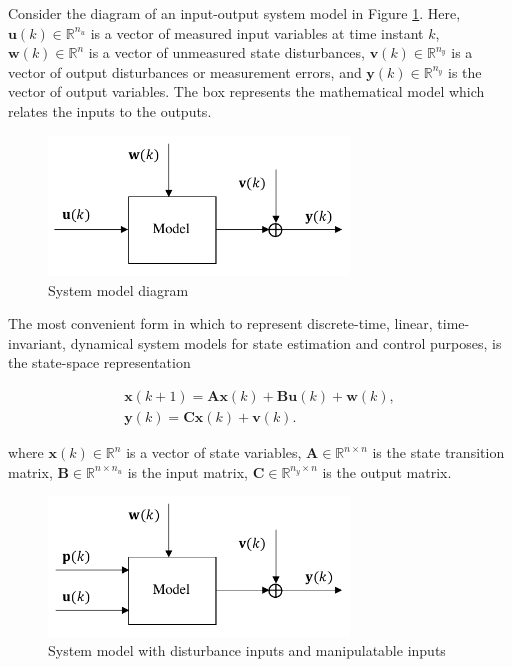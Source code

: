 Consider the diagram of an input-output system model in Figure \ref{fig:model_diag_uwvy}. Here, $\mathbf{u}(k) \in \mathbb{R}^{n_u}$ is a vector of measured input variables at time instant $k$, $\mathbf{w}(k) \in \mathbb{R}^n$ is a vector of unmeasured state disturbances, $\mathbf{v}(k) \in \mathbb{R}^{n_y}$ is a vector of output disturbances or measurement errors, and $\mathbf{y}(k) \in \mathbb{R}^{n_y}$ is the vector of output variables. The box represents the mathematical model which relates the inputs to the outputs.

\begin{figure}[htp]
	\centering
	\includegraphics[width=8cm]{images/model_diag_uwvy.pdf}
	\caption{System model diagram}
	\label{fig:model_diag_uwvy}
\end{figure}

The most convenient form in which to represent discrete-time, linear, time-invariant, dynamical system models for state estimation and control purposes, is the state-space representation

\begin{equation} \label{eq:ss_rep_uwy}
	\begin{aligned}
		\mathbf{x}(k+1) = \mathbf{A} \mathbf{x}(k) + \mathbf{B} \mathbf{u}(k) + \mathbf{w}(k), \\
		\mathbf{y}(k) = \mathbf{C} \mathbf{x}(k) + \mathbf{v}(k).
	\end{aligned}
\end{equation}

where $\mathbf{x}(k) \in \mathbb{R}^n$ is a vector of state variables, $\mathbf{A} \in \mathbb{R}^{n \times n}$ is the state transition matrix, $\mathbf{B} \in \mathbb{R}^{n \times n_u}$ is the input matrix, $\mathbf{C} \in \mathbb{R}^{n_y \times n}$ is the output matrix.

\begin{figure}[htp]
	\centering
	\includegraphics[width=8cm]{images/model_diag_upwvy.pdf}
	\caption{System model with disturbance inputs and manipulatable inputs}
	\label{fig:model_diag_upwvy}
\end{figure}

